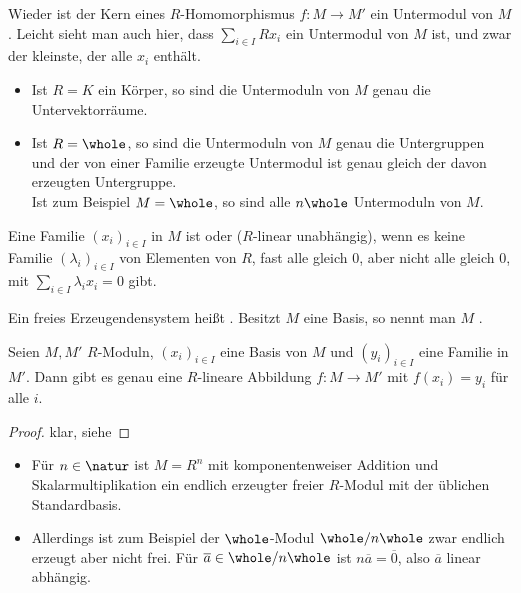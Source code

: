 \begin{remark}
	Wieder ist der Kern eines $R$-Homomorphismus $f:M\to M'$ ein Untermodul von $M$. Leicht sieht man auch hier, dass $\sum_{i\in I} Rx_i$ ein Untermodul von $M$ ist, und zwar der kleinste, der alle $x_i$ enthält.
\end{remark}

\begin{example}
	\begin{itemize}
		\item Ist $R=K$ ein Körper, so sind die Untermoduln von $M$ genau die Untervektorräume.
		\item Ist $R=\whole$, so sind die Untermoduln von $M$ genau die Untergruppen und der von einer Familie erzeugte Untermodul ist genau gleich der davon erzeugten Untergruppe. \\
		Ist zum Beispiel $M=\whole$, so sind alle $n\whole$ Untermoduln von $M$.
	\end{itemize}
\end{example}

\begin{definition}
	Eine Familie $(x_i)_{i\in I}$ in $M$ ist  oder ($R$-linear unabhängig), wenn es keine Familie $(\lambda_i)_{i\in I}$ von Elementen von $R$, fast alle gleich 0, aber nicht alle gleich 0, mit $\sum_{i\in I} \lambda_ix_i=0$ gibt.
	
	Ein freies Erzeugendensystem heißt . Besitzt $M$ eine Basis, so nennt man $M$ .
\end{definition}

\begin{proposition}
	Seien $M,M'$ $R$-Moduln, $(x_i)_{i\in I}$ eine Basis von $M$ und $(y_i)_{i\in I}$ eine Familie in $M'$. Dann gibt es genau eine $R$-lineare Abbildung $f:M\to M'$ mit $f(x_i)=y_i$ für alle $i$.
\end{proposition}
\begin{proof}
	klar, siehe 
\end{proof}

\begin{example}
	\begin{itemize}
		\item Für $n\in\natur$ ist $M=R^n$ mit komponentenweiser Addition und Skalarmultiplikation ein endlich erzeugter freier $R$-Modul mit der üblichen Standardbasis.
		\item Allerdings ist zum Beispiel der $\whole$-Modul $\whole/n\whole$ zwar endlich erzeugt aber nicht frei. Für $\overline{a}\in\whole/n\whole$ ist $n\overline{a}=\overline{0}$, also $\overline{a}$ linear abhängig.
	\end{itemize}
\end{example}

